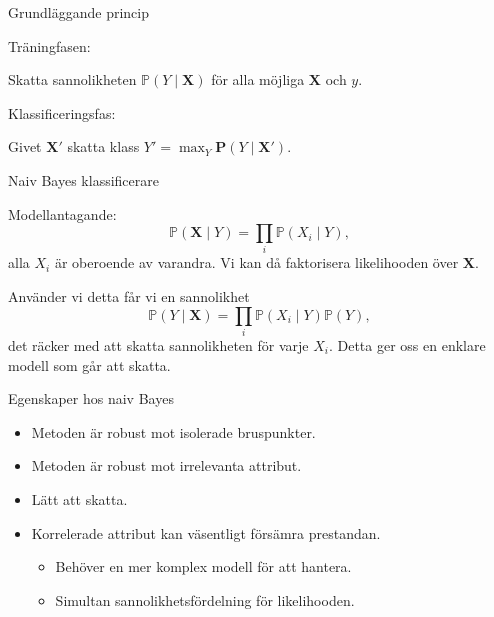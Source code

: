\documentclass[10pt,english]{beamer}
\begin{document}
\begin{frame}{Grundläggande princip}

    Träningfasen:

    Skatta sannolikheten $\mathbb{P}(Y \mid \mathbf{X})$ för alla möjliga $\mathbf{X}$ och $y$.

    Klassificeringsfas:

    Givet $\mathbf{X}'$ skatta klass $Y' = \max_Y \mathbf{P}(Y \mid \mathbf{X}')$.
    
\end{frame}

\begin{frame}{Naiv Bayes klassificerare}

    Modellantagande:
    \begin{equation*}
        \mathbb{P}(\mathbf{X} \mid Y) = \prod_i \mathbb{P}(X_i \mid Y),
    \end{equation*}
    alla $X_i$ är oberoende av varandra. Vi kan då faktorisera likelihooden över $\mathbf{X}$.

    Använder vi detta får vi en sannolikhet
    \begin{equation*}
        \mathbb{P}(Y \mid \mathbf{X}) = \prod_i \mathbb{P}(X_i \mid Y) \mathbb{P}(Y),
    \end{equation*}
    det räcker med att skatta sannolikheten för varje $X_i$. Detta ger oss en enklare modell som går att skatta.
    
\end{frame}

\begin{frame}{Egenskaper hos naiv Bayes}
    \begin{itemize}
        \item Metoden är robust mot isolerade bruspunkter.
        \item Metoden är robust mot irrelevanta attribut.
        \item Lätt att skatta.
        \item Korrelerade attribut kan väsentligt försämra prestandan.
        \begin{itemize}
            \item Behöver en mer komplex modell för att hantera.
            \item Simultan sannolikhetsfördelning för likelihooden.
        \end{itemize}
    \end{itemize}
\end{frame}
\end{document}
